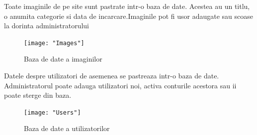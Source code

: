 \begin{itemize}
	Toate imaginile de pe site sunt pastrate intr-o baza de date. Acestea au un titlu, o anumita categorie si data de incarcare.Imaginile pot fi usor adaugate sau scoase la dorinta administratorului

	\begin{figure}[h!]
			\centering
 			 \texttt{[image: "Images"]}
 			 \caption{Baza de date a imaginilor}
 			 \label{fig:Calcui}
		\end{figure}
		
	Datele despre utilizatori de asemenea se pastreaza intr-o baza de date. Administratorul poate adauga utilizatori noi, activa conturile acestora sau ii poate sterge din baza.


	\begin{figure}[h!]
			\centering
 			 \texttt{[image: "Users"]}
 			 \caption{Baza de date a utilizatorilor}
 			 \label{fig:Calcui}
		\end{figure}


\end{itemize}
